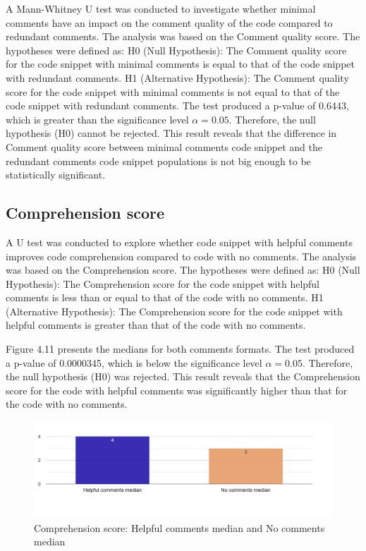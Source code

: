A Mann-Whitney U test was conducted to investigate whether minimal comments have an impact on the comment quality of the code compared to redundant comments. The analysis was based on the Comment quality score. The hypotheses were defined as: H0 (Null Hypothesis): The Comment quality score for the code snippet with minimal comments is equal to that of the code snippet with redundant comments. H1 (Alternative Hypothesis): The Comment quality score for the code snippet with minimal comments is not equal to that of the code snippet with redundant comments.  The test produced a p-value of 0.6443, which is greater than the significance level $\alpha = 0.05$. Therefore, the null hypothesis (H0) cannot be rejected. This result reveals that the difference in Comment quality score between minimal comments code snippet and the redundant comments code snippet populations is not big enough to be statistically significant.


\subsection{Comprehension score}
A U test was conducted to explore whether code snippet with helpful comments improves code comprehension compared to code with no comments. The analysis was based on the Comprehension score. The hypotheses were defined as: H0 (Null Hypothesis): The Comprehension score for the code snippet with helpful comments is less than or equal to that of the code with no comments.  H1 (Alternative Hypothesis): The Comprehension score for the code snippet with helpful comments is greater than that of the code with no comments.


Figure 4.11 presents the medians for both comments formats.
The test produced a p-value of  0.0000345, which is below the significance level $\alpha = 0.05$. Therefore, the null hypothesis (H0) was rejected.  This result reveals that the Comprehension score for the code with helpful comments was significantly higher than that for the code with no comments. 


\begin{figure} [H]
  \centering
  \includegraphics[scale=0.4]{figures/h-0-q3.png}
  \caption{Comprehension score:  Helpful comments median and No comments median}
  \label{fig:AnhangsChor}
\end{figure}




